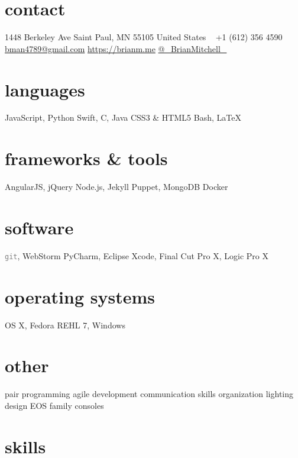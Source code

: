 \documentclass[]{cv-style} %
\begin{document}
\lastupdated


\begin{aside} %
\section{contact}
1448 Berkeley Ave
Saint Paul, MN 55105
United States
~
+1 (612) 356 4590
~
\href{mailto:bman4789@gmail.com}{bman4789@gmail.com}
\href{https://brianm.me}{https://brianm.me}
\href{https://twitter.com/_BrianMitchell_}{\textcolor{twitter}{ }@\_BrianMitchell\_}
\section{languages}
JavaScript, Python
Swift, C, Java
CSS3 \& HTML5
Bash, \LaTeX
\section{frameworks \& tools}
AngularJS, jQuery
Node.js, Jekyll
Puppet, MongoDB
Docker
\section{software}
\textcolor{gray}{\texttt{git}}, WebStorm
PyCharm, Eclipse
Xcode, Final Cut Pro X,
Logic Pro X
\section{operating systems}
OS X, Fedora
REHL 7, Windows
\section{other}
pair programming
agile development
communication skills
organization
lighting design
EOS family consoles
\end{aside}


\section{skills}
  \vspace{-0.2cm}
\end{document}
